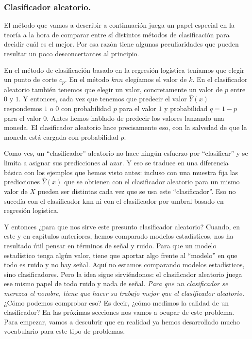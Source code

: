 \subsubsection{Clasificador aleatorio.}

El método que vamos a describir a continuación juega un papel especial en la teoría a la hora de comparar entre sí distintos métodos de clasificación para decidir cuál es el mejor. Por esa razón tiene algunas peculiaridades que pueden resultar un poco desconcertantes al principio.

En el método de clasificación basado en la regresión logística teníamos que elegir un punto de corte $c_p$. En el método $knn$ elegíamos el valor de $k$. En el clasificador aleatorio también tenemos que elegir un valor, concretamente un valor de $p$ entre $0$ y $1$.  Y entonces, cada vez que tenemos que predecir el  valor $\hat{Y}(x)$ respondemos $1$ o $0$ con probabilidad $p$ para el valor $1$ y probabilidad $q =1 - p$ para el valor $0$. Antes hemos hablado de predecir los valores lanzando una moneda. El clasificador aleatorio hace precisamente eso, con la salvedad de que la moneda está cargada con probabilidad $p$.

Como ves, un ``clasificador'' aleatorio no hace ningún esfuerzo por ``clasificar'' y se limita a asignar sus predicciones al azar.  Y eso se traduce en una diferencia básica con los ejemplos que hemos visto antes: incluso con una muestra fija las predicciones $\hat{Y}(x)$ que se obtienen con el clasificador aleatorio para un mismo valor de $X$ pueden ser distintas cada vez que se usa este ``clasificador''. Eso no sucedía con el clasificador knn ni con el clasificador por umbral basado en regresión logística.


Y entonces ¿para que nos sirve este presunto clasificador aleatorio? Cuando, en este y en capítulos anteriores, hemos comparado modelos estadísticos, nos ha resultado útil pensar en términos de señal y ruido. Para que un modelo estadístico tenga algún valor, tiene que aportar algo frente al ``modelo'' en que todo es ruido y no hay señal. Aquí no estamos comparando modelos estadísticos, sino clasificadores. Pero la idea sigue sirviéndonos: el clasificador aleatorio juega ese mismo papel de todo ruido y nada de señal. {\em Para que un clasificador se merezca el nombre, tiene que hacer su trabajo mejor que el clasificador aleatorio.} ¿Cómo podemos comprobar eso? Es decir, ¿cómo medimos la calidad de un clasificador? En las próximas secciones nos vamos a ocupar de este problema. Para empezar, vamos a descubrir que en realidad ya hemos desarrollado mucho vocabulario para este tipo de problemas.

